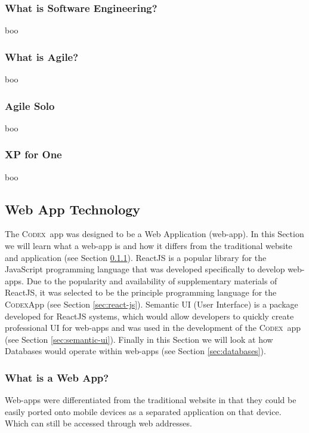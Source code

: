 \documentclass[final]{cmpreport}
\newcommand{\Codex}{\textsc{Codex}}
\begin{document}
			\subsubsection{What is Software Engineering?} \label{sec:what-se}
			boo
				
			\subsubsection{What is Agile?} \label{sec:what-agile}
			boo
			
			\subsubsection{Agile Solo} \label{sec:agile-solo}
			boo
			
			\subsubsection{XP for One} \label{sec:xp-for-one}
			boo
			
		\subsection{Web App Technology} \label{sec:web-app}
		The \Codex \ app was designed to be a Web Application (web-app). In this Section we will learn what a web-app is and how it differs from the traditional website and application (see Section \ref{sec:what-web-app}). ReactJS is a popular library for the JavaScript programming language that was developed specifically to develop web-apps. Due to the popularity and availability of supplementary materials of ReactJS, it was selected to be the principle programming language for the \Codex App (see Section \ref{sec:react-js}). Semantic UI (User Interface) is a package developed for ReactJS systems, which would allow developers to quickly create professional UI for web-apps and was used in the development of the \Codex \ app (see Section \ref{sec:semantic-ui}). Finally in this Section we will look at how Databases would operate within web-apps (see Section \ref{sec:databases}). 
		
			\subsubsection{What is a Web App?} \label{sec:what-web-app}
			Web-apps were differentiated from the traditional website in that they could be easily ported onto mobile devices as a separated application on that device. Which can still be accessed through web addresses.
				
\end{document}
